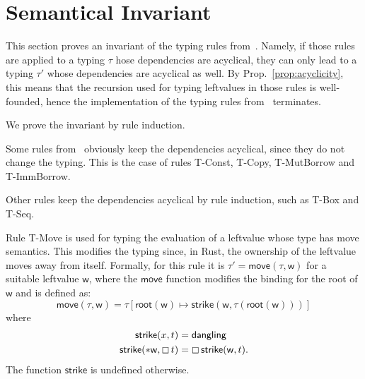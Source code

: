\section{Semantical Invariant}\label{sec:invariant}

This section proves an invariant of the typing rules
from~\cite{Pearce21}. Namely,
if those rules are applied to a typing $\tau$ hose dependencies are acyclical,
they can only lead to a typing $\tau'$ whose dependencies are acyclical as well.
By Prop.~\ref{prop:acyclicity}, this means that the recursion used for
typing leftvalues in those rules is well-founded,
hence the implementation of the typing rules from~\cite{Pearce21} terminates.

We prove the invariant by rule induction.

Some rules from~\cite{Pearce21} obviously keep the dependencies acyclical,
since they do not change the typing. This is the case of rules
\textsf{T-Const}, \textsf{T-Copy}, \textsf{T-MutBorrow} and
\textsf{T-ImmBorrow}.

Other rules keep the dependencies acyclical by rule induction,
such as \textsf{T-Box} and \textsf{T-Seq}.

Rule \textsf{T-Move} is used for typing the evaluation of a leftvalue
whose type has move semantics. This modifies the typing since, in Rust,
the ownership of the leftvalue moves away from itself.
Formally, for this rule it is $\tau'=\mathsf{move}(\tau,\mathsf{w})$
for a suitable leftvalue $\mathsf{w}$,
where the $\mathsf{move}$ function
modifies the binding for the root of $\mathsf{w}$ and is defined as:
\[
\mathsf{move}(\tau,\mathsf{w})=\tau[\mathsf{root}(\mathsf{w})\mapsto
  \mathsf{strike}(\mathsf{w},\tau(\mathsf{root}(\mathsf{w})))]
\]
where
\begin{align*}
  \mathsf{strike}(x,t)&=\mathsf{dangling}\\
  \mathsf{strike}(\mathtt{*}\mathsf{w},\boxempty\,{t})&=
  \boxempty\,{\mathsf{strike}(\mathsf{w},t)}.
\end{align*}
The function $\mathsf{strike}$ is undefined otherwise.

